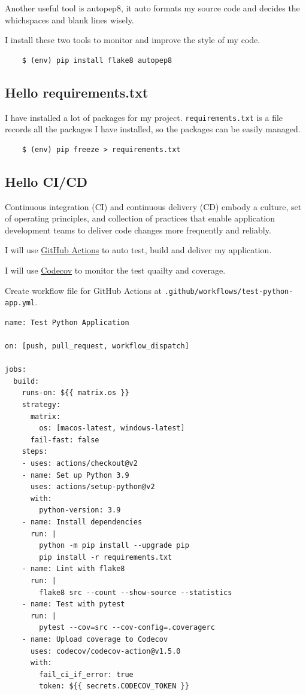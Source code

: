 \documentclass{report}
\begin{document}
Another useful tool is autopep8, it auto formats my source code and decides the whichspaces and blank lines wisely. 

I install these two tools to monitor and improve the style of my code.

\begin{verbatim}
    $ (env) pip install flake8 autopep8
\end{verbatim}

\subsection{Hello requirements.txt}

I have installed a lot of packages for my project. \texttt{requirements.txt} is a file records all the packages I have installed, so the packages can be easily managed.

\begin{verbatim}
    $ (env) pip freeze > requirements.txt
\end{verbatim}

\subsection{Hello CI/CD}

Continuous integration (CI) and continuous delivery (CD) embody a culture, set of operating principles, and collection of practices that enable application development teams to deliver code changes more frequently and reliably.

I will use \href{https://github.com/features/actions}{GitHub Actions} to auto test, build and deliver my application. 

I will use \href{https://codecov.io/}{Codecov} to monitor the test quailty and coverage.

Create workflow file for GitHub Actions at \texttt{.github/workflows/test-python-app.yml}.

\begin{verbatim}
name: Test Python Application

on: [push, pull_request, workflow_dispatch]

jobs:
  build:
    runs-on: ${{ matrix.os }}
    strategy:
      matrix:
        os: [macos-latest, windows-latest]
      fail-fast: false
    steps:
    - uses: actions/checkout@v2
    - name: Set up Python 3.9
      uses: actions/setup-python@v2
      with:
        python-version: 3.9
    - name: Install dependencies
      run: |
        python -m pip install --upgrade pip
        pip install -r requirements.txt
    - name: Lint with flake8
      run: |
        flake8 src --count --show-source --statistics
    - name: Test with pytest
      run: |
        pytest --cov=src --cov-config=.coveragerc
    - name: Upload coverage to Codecov
      uses: codecov/codecov-action@v1.5.0
      with:
        fail_ci_if_error: true
        token: ${{ secrets.CODECOV_TOKEN }}
\end{verbatim}
\end{document}
